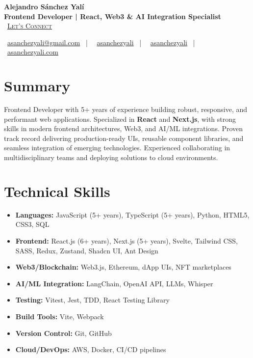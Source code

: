 \documentclass[letterpaper,11pt]{article}
\newcommand{\normalfaCalendar}{{\mdseries\faCalendar}}
\newcommand{\normalfaEnvelope}{{\mdseries\faEnvelope}}
\newcommand{\normalfaLinkedin}{{\mdseries\faLinkedin}}
\newcommand{\normalfaGithub}{{\mdseries\faGithub}}
\newcommand{\normalfaGlobe}{{\mdseries\faGlobe}}
\begin{document}
\begin{center}
\textbf{\Huge Alejandro Sánchez Yalí}\\[0.3em]
\textbf{\Large Frontend Developer | React, Web3 \& AI Integration Specialist}\\[0.5em]
\small
\normalfaCalendar\ \href{https://cal.com/asanchezyali/full-time-opportunities}{\textsc{Let's Connect}}

\vspace{1em}
\normalfaEnvelope\ \href{mailto:asanchezyali@gmail.com}{asanchezyali@gmail.com}  ~|~
\normalfaLinkedin\ \href{https://www.linkedin.com/in/asanchezyali}{asanchezyali} ~|~
\normalfaGithub\ \href{https://github.com/asanchezyali}{asanchezyali}  ~|~
\normalfaGlobe\ \href{https://asanchezyali.com}{asanchezyali.com}
\end{center}

\section{Summary}
Frontend Developer with 5+ years of experience building robust, responsive, and performant web applications. Specialized in \textbf{React} and \textbf{Next.js}, with strong skills in modern frontend architectures, Web3, and AI/ML integrations. Proven track record delivering production-ready UIs, reusable component libraries, and seamless integration of emerging technologies. Experienced collaborating in multidisciplinary teams and deploying solutions to cloud environments.

\section{Technical Skills}
\begin{itemize}[leftmargin=*]
  \item \textbf{Languages:} JavaScript (5+ years), TypeScript (5+ years), Python, HTML5, CSS3, SQL
  \item \textbf{Frontend:} React.js (6+ years), Next.js (5+ years), Svelte, Tailwind CSS, SASS, Redux, Zustand, Shadcn UI, Ant Design
  \item \textbf{Web3/Blockchain:} Web3.js, Ethereum, dApp UIs, NFT marketplaces
  \item \textbf{AI/ML Integration:} LangChain, OpenAI API, LLMs, Whisper
  \item \textbf{Testing:} Vitest, Jest, TDD, React Testing Library
  \item \textbf{Build Tools:} Vite, Webpack
  \item \textbf{Version Control:} Git, GitHub
  \item \textbf{Cloud/DevOps:} AWS, Docker, CI/CD pipelines
\end{itemize}
\end{document}
